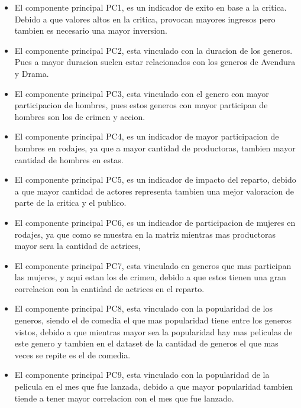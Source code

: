 \documentclass[
]{article}
\begin{document}
\begin{itemize}
\item
  El componente principal PC1, es un indicador de exito en base a la
  critica. Debido a que valores altos en la critica, provocan mayores
  ingresos pero tambien es necesario una mayor inversion.
\item
  El componente principal PC2, esta vinculado con la duracion de los
  generos. Pues a mayor duracion suelen estar relacionados con los
  generos de Avendura y Drama.
\item
  El componente principal PC3, esta vinculado con el genero con mayor
  participacion de hombres, pues estos generos con mayor participan de
  hombres son los de crimen y accion.
\item
  El componente principal PC4, es un indicador de mayor participacion de
  hombres en rodajes, ya que a mayor cantidad de productoras, tambien
  mayor cantidad de hombres en estas.
\item
  El componente principal PC5, es un indicador de impacto del reparto,
  debido a que mayor cantidad de actores representa tambien una mejor
  valoracion de parte de la critica y el publico.
\item
  El componente principal PC6, es un indicador de participacion de
  mujeres en rodajes, ya que como se muestra en la matriz mientras mas
  productoras mayor sera la cantidad de actrices,
\item
  El componente principal PC7, esta vinculado en generos que mas
  participan las mujeres, y aqui estan los de crimen, debido a que estos
  tienen una gran correlacion con la cantidad de actrices en el reparto.
\item
  El componente principal PC8, esta vinculado con la popularidad de los
  generos, siendo el de comedia el que mas popularidad tiene entre los
  generos vistos, debido a que mientras mayor sea la popularidad hay mas
  peliculas de este genero y tambien en el dataset de la cantidad de
  generos el que mas veces se repite es el de comedia.
\item
  El componente principal PC9, esta vinculado con la popularidad de la
  pelicula en el mes que fue lanzada, debido a que mayor popularidad
  tambien tiende a tener mayor correlacion con el mes que fue lanzado.
\end{itemize}
\end{document}
